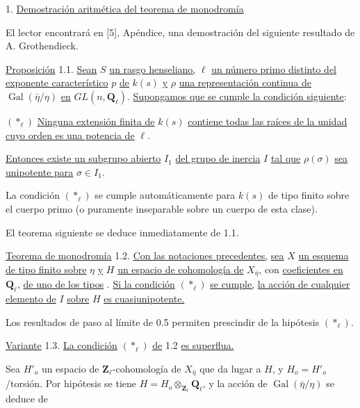 1.  \underline{Demostración aritmética del teorema de monodromía}

El lector encontrará en [5], Apéndice, una demostración del siguiente resultado de A. Grothendieck.

\underline{Proposición} 1.1.  \underline{Sean} $S$ \underline{un rasgo henseliano,} $\ell$ \underline{un número primo distinto del exponente característico} $p$ \underline{de} $k(s)$ \underline{y} $\rho$ \underline{una representación continua de} $\operatorname{Gal}(\bar\eta/\eta)$ \underline{en} $GL(n,\mathbf{Q}_\ell)$. \underline{Supongamos que se cumple la condición siguiente}:

$(*_\ell)$      \underline{Ninguna extensión finita de} $k(s)$ \underline{contiene todas las raíces de la unidad cuyo orden es una potencia de} $\ell$.



\underline{Entonces existe un subgrupo abierto} $I_1$ \underline{del grupo de inercia} $I$ \underline{tal que} $\rho(\sigma)$ \underline{sea unipotente para} $\sigma \in I_1$.

La condición $(*_\ell)$ se cumple automáticamente para $k(s)$ de tipo finito sobre el cuerpo primo (o puramente inseparable sobre un cuerpo de esta clase).

El teorema siguiente se deduce inmediatamente de 1.1.

\underline{Teorema de monodromía} 1.2.  \underline{Con las notaciones precedentes,} \underline{sea} $X$ \underline{un esquema de tipo finito sobre} $\eta$ \underline{y} $H$ \underline{un espacio de cohomología de} $X_{\bar\eta}$, con \underline{coeficientes en} $\mathbf{Q}_\ell$, \underline{de uno de los tipos} . \underline{Si la condición} $(*_\ell)$ \underline{se cumple,} \underline{la acción de cualquier elemento de} $I$ \underline{sobre} $H$ \underline{es cuasiunipotente.}

Los resultados de paso al límite de 0.5 permiten prescindir de la hipótesis $(*_\ell)$.

\underline{Variante} 1.3.  \underline{La condición} $(*_\ell)$ \underline{de} 1.2 \underline{es superflua.}

Sea $H'_o$ un espacio de $\mathbf{Z}_\ell$-cohomología de $X_{\bar\eta}$ que da lugar a $H$, y $H_o = H'_o$/torsión. Por hipótesis se tiene $H = H_o \otimes_{\mathbf{Z}_\ell} \mathbf{Q}_\ell$, y la acción de $\operatorname{Gal}(\bar\eta/\eta)$ se deduce de


